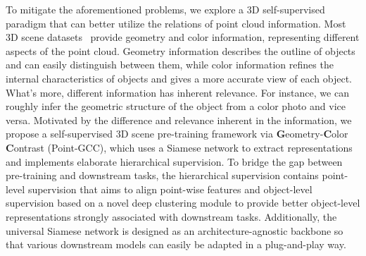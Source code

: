 \documentclass{article}
\begin{document}
To mitigate the aforementioned problems, we explore a 3D self-supervised paradigm that can better utilize the relations of point cloud information. Most 3D scene datasets~\cite{dai2017scannet, song2015sun, armeni_cvpr16} provide geometry and color information, representing different aspects of the point cloud. Geometry information describes the outline of objects and can easily distinguish between them, while color information refines the internal characteristics of objects and gives a more accurate view of each object. What's more, different information has inherent relevance. For instance, we can roughly infer the geometric structure of the object from a color photo and vice versa. Motivated by the difference and relevance inherent in the information, we propose a self-supervised 3D scene pre-training framework via \textbf{G}eometry-\textbf{C}olor \textbf{C}ontrast (Point-GCC), which uses a Siamese network to extract representations and implements elaborate hierarchical supervision. To bridge the gap between pre-training and downstream tasks, the hierarchical supervision contains point-level supervision that aims to align point-wise features and object-level supervision based on a novel deep clustering module to provide better object-level representations strongly associated with downstream tasks.  
Additionally, the universal Siamese network is designed as an architecture-agnostic backbone so that various downstream models can easily be adapted in a plug-and-play way.
\end{document}
